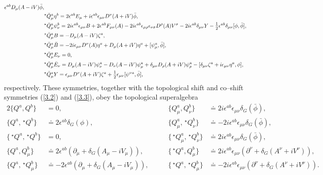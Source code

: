 \documentclass[a4paper,11pt]{article}
\begin{document}
\begin{align}
\epsilon^{ab} D_\mu(A - i V) \bar{\phi},
\nonumber
\\
&^\star \bar{Q}_\mu^a \eta^b = 2 \epsilon^{ab} E_\mu + 
i \epsilon^{ab} \epsilon_{\mu\nu} D^\nu(A + i V) \bar{\phi},
\nonumber
\\
&^\star \bar{Q}_\mu^a \psi_\nu^b = 2 i \epsilon^{ab} \epsilon_{\mu\nu} B + 
2 \epsilon^{ab} F_{\mu\nu}(A) -  
2 i \epsilon^{ab} \epsilon_{\mu\rho} \epsilon_{\nu\sigma} D^\rho(A) V^\sigma -
2 i \epsilon^{ab} \delta_{\mu\nu} Y -
\hbox{\large$\frac{1}{2}$} \epsilon^{ab} \delta_{\mu\nu} [ \phi, \bar{\phi} ],
\nonumber
\\
&^\star \bar{Q}_\mu^a B = - D_\mu(A - i V) \zeta^a,
\nonumber
\\
&^\star \bar{Q}_\mu^a \bar{B} = - 2 i \epsilon_{\mu\nu} D^\nu(A) \eta^a +
D_\mu(A + i V) \eta^a + [ \psi_\mu^a, \bar{\phi} ],
\nonumber
\\
&^\star \bar{Q}_\mu^a E_\nu = 0,
\nonumber
\\
&^\star \bar{Q}_\mu^a \bar{E}_\nu = D_\mu(A - i V) \psi_\nu^a - 
D_\nu(A - i V) \psi_\mu^a +
\delta_{\mu\nu} D_\rho(A + i V) \psi_\rho^a -
[ \delta_{\mu\nu} \zeta^a + i \epsilon_{\mu\nu} \eta^a, \phi ],
\nonumber
\\
&^\star \bar{Q}_\mu^a Y = \epsilon_{\mu\nu} D^\nu(A + i V) \zeta^a +
\hbox{\large$\frac{1}{2}$} \epsilon_{\mu\nu} [ \psi^{\nu a}, \bar{\phi} ],
\end{align}
respectively. These symmetries, together with the topological shift and 
co--shift symmetries (\ref{3.2}) and (\ref{3.3}), obey the topological 
superalgebra 
\begin{alignat*}{2}
\{ Q^a, Q^b \} &= 0,
&\qquad
\{ Q_\mu^a, Q_\nu^b \} &\doteq 
2 i \epsilon^{ab} \epsilon_{\mu\nu} \delta_G(\bar{\phi}),
\\
\{ Q^a, \,^\star Q^b \} &\doteq 
2 \epsilon^{ab} \delta_G(\phi),
&\qquad
\{ Q_\mu^a, \,^\star Q_\nu^b \} &\doteq 
- 2 i \epsilon^{ab} \epsilon_{\mu\nu} \delta_G(\bar{\phi}),
\\
\{ \,^\star Q^a, \,^\star Q^b \} &= 0,
&\qquad
\{ \,^\star Q_\mu^a, \,^\star Q_\nu^b \} &\doteq 
2 i \epsilon^{ab} \epsilon_{\mu\nu} \delta_G(\bar{\phi}),
\\
\{ Q^a, Q_\mu^b \} &\doteq 2 \epsilon^{ab} (
\partial_\mu + \delta_G(A_\mu - i V_\mu)),
&\qquad
\{ \,^\star Q^a, Q_\mu^b \} &\doteq 2 i \epsilon^{ab} 
\epsilon_{\mu\nu} ( \partial^\nu + \delta_G(A^\nu + i V^\nu)),
\\
\{ Q^a, \,^\star Q_\mu^b \} &\doteq - 2 \epsilon^{ab} (
\partial_\mu + \delta_G(A_\mu - i V_\mu)),
&\qquad
\{ \,^\star Q^a, \,^\star Q_\mu^b \} &\doteq - 2 i \epsilon^{ab} 
\epsilon_{\mu\nu} ( \partial^\nu + \delta_G(A^\nu + i V^\nu)).
\end{alignat*}
\end{document}
